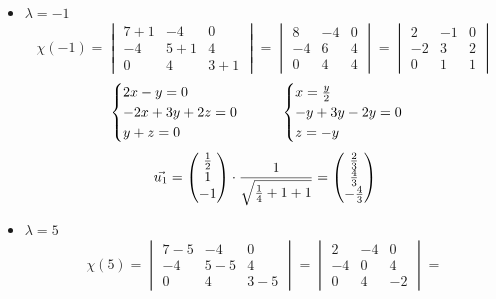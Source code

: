 \begin{itemize}
	\item $ \lambda = -1 $
    $$ \chi(-1) =
    \begin{vmatrix}
        7 + 1 & -4 & 0 \\
        -4 & 5 + 1 & 4 \\
        0 & 4 & 3 + 1
    \end{vmatrix} =
    \begin{vmatrix}
    	8 & -4 & 0 \\
        -4 & 6 & 4 \\
        0 & 4 & 4
    \end{vmatrix} =
    \begin{vmatrix}
    	2 & -1 & 0 \\
        -2 & 3 & 2 \\
        0 & 1 & 1
    \end{vmatrix} $$
    $$
    \begin{cases}
    	2x - y = 0 \\
        -2x + 3y + 2z = 0 \\
        y + z = 0
    \end{cases} \qquad
    \begin{cases}
    	x = \half[y] \\
        -y + 3y - 2y = 0 \\
        z = -y
    \end{cases} $$
    $$ \vec{u_1} =
    \begin{pmatrix}
    	\half \\
        1 \\
        -1
    \end{pmatrix} \cdot \frac1{\sqrt{\frac14 + 1 + 1}} =
    \begin{pmatrix}
    	\frac23 \\
        \frac43 \\
        -\frac43
    \end{pmatrix} $$
    \item $ \lambda = 5 $
    $$ \chi(5) =
    \begin{vmatrix}
    	7 - 5 & -4 & 0 \\
        -4 & 5 - 5 & 4 \\
        0 & 4 & 3 - 5
    \end{vmatrix} =
    \begin{vmatrix}
    	2 & -4 & 0 \\
        -4 & 0 & 4 \\
        0 & 4 & -2
    \end{vmatrix} =
$$
\end{itemize}
